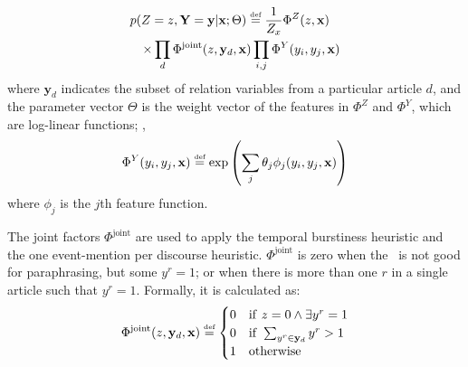 \begin{eqnarray*}
\lefteqn{p(Z = z, \mathbf{Y} = \mathbf{y}|\mathbf{x}; \Theta) \stackrel{\text{\tiny def}}{=} \frac{1}{Z_{x}}\Phi^{Z}(z,\mathbf{x}) }\\
    && \times \prod_d \Phi^{\text{joint}}(z,\mathbf{y}_d,\mathbf{x})
        \prod_{i,j} \Phi^Y (y_i,y_j,\mathbf{x})
\end{eqnarray*}
\noindent
where $\mathbf{y}_d$ indicates the subset of relation variables from a
particular article $d$, and the parameter vector $\Theta$ is the weight vector
of the features in $\Phi^Z$ and $\Phi^Y$, which are log-linear functions; \ie,
\[
\Phi^{Y}(y_i,y_j,\mathbf{x}) \stackrel{\text{\tiny def}}{=}
\exp \left( \sum_j \theta_{j} \phi_j(y_i,y_j,\mathbf{x}) \right)
\]
where $\phi_j$ is the $j$th feature function.

The joint factors $\Phi^{\text{joint}}$ are used to apply the temporal
burstiness heuristic and the one event-mention per discourse
heuristic.  $\Phi^{\text{joint}}$ is zero when the \eec\ is not good
for paraphrasing, but some $y^r=1$; or when there is more than one $r$ in a
single article such that $y^r=1$.
Formally, it is calculated as:
\[
\Phi^{\text{joint}}(z,\mathbf{y}_d,\mathbf{x})
\stackrel{\text{\tiny def}}{=}
\begin{cases}
\footnotesize
0  & {\rm if} ~ z=0 \land \exists  y^r = 1  \\
0  & {\rm if} ~ \sum_{y^r\in \mathbf{y}_d} y^r > 1  \\
1  & {\rm otherwise} \\
\end{cases}
\]









